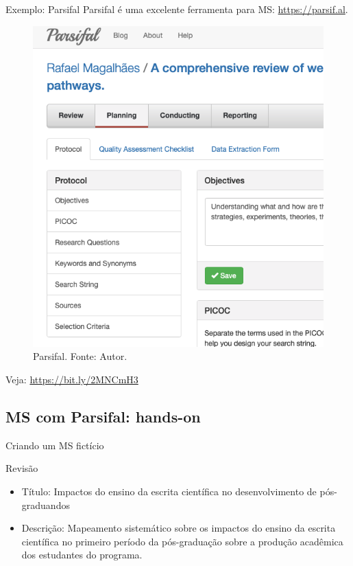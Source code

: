 \begin{frame}{Exemplo: Parsifal}
Parsifal é uma excelente ferramenta para MS: \url{https://parsif.al}.
\begin{figure}
\centering
\includegraphics[scale=0.2]{figs/02/ms2}
\caption{Parsifal. Fonte: Autor.}
\end{figure}
Veja: \url{https://bit.ly/2MNCmH3}
\end{frame}


\subsection{MS com Parsifal: hands-on}

\begin{frame}{Criando um MS fictício}
\begin{block}{Revisão}
\begin{itemize}
\item Título: Impactos do ensino da escrita científica no desenvolvimento de pós-graduandos
\item Descrição: Mapeamento sistemático sobre os impactos do ensino da escrita científica no primeiro período da pós-graduação sobre a produção acadêmica dos estudantes do programa.
\end{itemize}
\end{block}
\end{frame}

